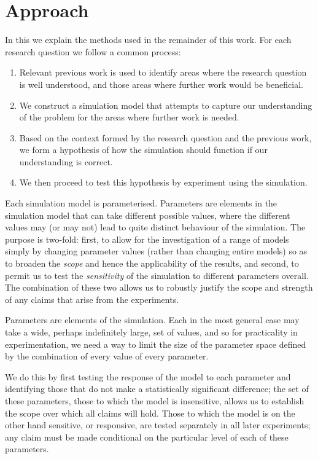 \section{Approach}\label{methods}

In this  we explain the methods used in the remainder of this work. For each research question we follow a common process:
\begin{enumerate}
	\item Relevant previous work is used to identify areas where the research question is well understood, and those areas where further work would be beneficial.
	\item We construct a simulation model that attempts to capture our understanding of the problem for the areas where further work is needed.
	\item Based on the context formed by the research question and the previous work, we form a hypothesis of how the simulation should function if our understanding is correct.
	\item We then proceed to test this hypothesis by experiment using the simulation.
\end{enumerate}

Each simulation model is parameterised. Parameters are elements in the simulation model that can take different possible values, where the different values may (or may not) lead to quite distinct behaviour of the simulation. The purpose is two-fold: first, to allow for the investigation of a range of models simply by changing parameter values (rather than changing entire models) so as to broaden the \emph{scope} and hence the applicability of the results, and second, to permit us to test the \emph{sensitivity} of the simulation to different parameters overall. The combination of these two allows us to robustly justify the scope and strength of any claims that arise from the experiments.

Parameters are elements of the simulation. Each in the most general case may take a wide, perhaps indefinitely large, set of values, and so for practicality in experimentation, we need a way to limit the size of the parameter space defined by the combination of every value of every parameter. 

We do this by first testing the response of the model to each parameter and identifying those that do not make a statistically significant difference; the set of these parameters, those to which the model is insensitive, allows us to establish the scope over which all claims will hold. Those to which the model is on the other hand sensitive, or responsive, are tested separately in all later experiments; any claim must be made conditional on the particular level of each of these parameters.

